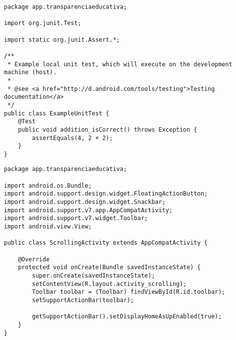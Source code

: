 \documentclass[12pt,a4paper]{article}
\begin{document}
\begin{lstlisting}[caption=./mobile/src/test/java/app/transparenciaeducativa/ExampleUnitTest.java]
package app.transparenciaeducativa;

import org.junit.Test;

import static org.junit.Assert.*;

/**
 * Example local unit test, which will execute on the development machine (host).
 *
 * @see <a href="http://d.android.com/tools/testing">Testing documentation</a>
 */
public class ExampleUnitTest {
    @Test
    public void addition_isCorrect() throws Exception {
        assertEquals(4, 2 + 2);
    }
}
\end{lstlisting}
\pagebreak

\begin{lstlisting}[caption=./mobile/src/main/java/app/transparenciaeducativa/ScrollingActivity.java]
package app.transparenciaeducativa;

import android.os.Bundle;
import android.support.design.widget.FloatingActionButton;
import android.support.design.widget.Snackbar;
import android.support.v7.app.AppCompatActivity;
import android.support.v7.widget.Toolbar;
import android.view.View;

public class ScrollingActivity extends AppCompatActivity {

    @Override
    protected void onCreate(Bundle savedInstanceState) {
        super.onCreate(savedInstanceState);
        setContentView(R.layout.activity_scrolling);
        Toolbar toolbar = (Toolbar) findViewById(R.id.toolbar);
        setSupportActionBar(toolbar);

        getSupportActionBar().setDisplayHomeAsUpEnabled(true);
    }
}
\end{lstlisting}
\pagebreak
\end{document}
